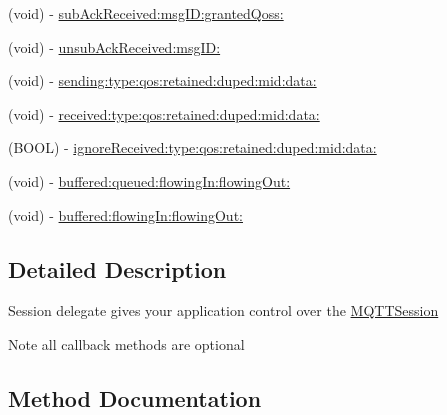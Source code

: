 \begin{DoxyCompactItemize}
\item 
(void) -\/ \hyperlink{protocol_m_q_t_t_session_delegate_01-p_a23603651fef7f317958e947c95a6a726}{sub\+Ack\+Received\+:msg\+I\+D\+:granted\+Qoss\+:}
\item 
(void) -\/ \hyperlink{protocol_m_q_t_t_session_delegate_01-p_a9f740585b1691979cdb40003eb9554b0}{unsub\+Ack\+Received\+:msg\+I\+D\+:}
\item 
(void) -\/ \hyperlink{protocol_m_q_t_t_session_delegate_01-p_ae91831aacee0d83bbba7ba8e407b46d9}{sending\+:type\+:qos\+:retained\+:duped\+:mid\+:data\+:}
\item 
(void) -\/ \hyperlink{protocol_m_q_t_t_session_delegate_01-p_a2e8ce3ec932c894249724e0d4191e94b}{received\+:type\+:qos\+:retained\+:duped\+:mid\+:data\+:}
\item 
(B\+O\+OL) -\/ \hyperlink{protocol_m_q_t_t_session_delegate_01-p_a83a727d0d2828817439834310c1eff1f}{ignore\+Received\+:type\+:qos\+:retained\+:duped\+:mid\+:data\+:}
\item 
(void) -\/ \hyperlink{protocol_m_q_t_t_session_delegate_01-p_acc3f5c247e8dec26d625ef08ad3d33e3}{buffered\+:queued\+:flowing\+In\+:flowing\+Out\+:}
\item 
(void) -\/ \hyperlink{protocol_m_q_t_t_session_delegate_01-p_a1702bf3189050f5f3f593a72f36f6408}{buffered\+:flowing\+In\+:flowing\+Out\+:}
\end{DoxyCompactItemize}


\subsection{Detailed Description}
Session delegate gives your application control over the \hyperlink{interface_m_q_t_t_session}{M\+Q\+T\+T\+Session} \begin{DoxyNote}{Note}
all callback methods are optional 
\end{DoxyNote}


\subsection{Method Documentation}
\mbox{\label{protocol_m_q_t_t_session_delegate_01-p_a1702bf3189050f5f3f593a72f36f6408}} 

